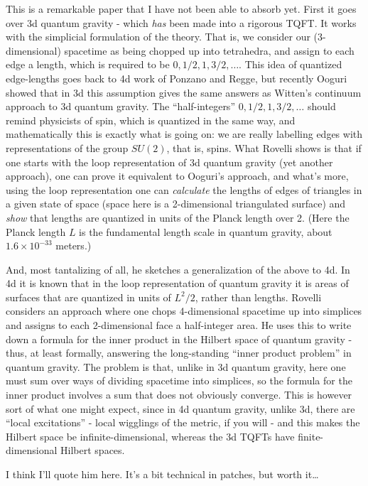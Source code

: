 \documentclass{article}
\begin{document}
This is a remarkable paper that I have not been able to absorb yet.
First it goes over 3d quantum gravity - which \emph{has} been made into
a rigorous TQFT. It works with the simplicial formulation of the theory.
That is, we consider our (3-dimensional) spacetime as being chopped up
into tetrahedra, and assign to each edge a length, which is required to
be \(0,1/2,1,3/2,\ldots\). This idea of quantized edge-lengths goes back
to 4d work of Ponzano and Regge, but recently Ooguri showed that in 3d
this assumption gives the same answers as Witten's continuum approach to
3d quantum gravity. The ``half-integers'' \(0,1/2,1,3/2,\ldots\) should
remind physicists of spin, which is quantized in the same way, and
mathematically this is exactly what is going on: we are really labelling
edges with representations of the group \(SU(2)\), that is, spins. What
Rovelli shows is that if one starts with the loop representation of 3d
quantum gravity (yet another approach), one can prove it equivalent to
Ooguri's approach, and what's more, using the loop representation one
can \emph{calculate} the lengths of edges of triangles in a given state
of space (space here is a 2-dimensional triangulated surface) and
\emph{show} that lengths are quantized in units of the Planck length
over 2. (Here the Planck length \(L\) is the fundamental length scale in
quantum gravity, about \(1.6 \times 10^{-33}\) meters.)

And, most tantalizing of all, he sketches a generalization of the above
to 4d. In 4d it is known that in the loop representation of quantum
gravity it is areas of surfaces that are quantized in units of
\(L^2/2\), rather than lengths. Rovelli considers an approach where one
chops 4-dimensional spacetime up into simplices and assigns to each
2-dimensional face a half-integer area. He uses this to write down a
formula for the inner product in the Hilbert space of quantum gravity -
thus, at least formally, answering the long-standing ``inner product
problem'' in quantum gravity. The problem is that, unlike in 3d quantum
gravity, here one must sum over ways of dividing spacetime into
simplices, so the formula for the inner product involves a sum that does
not obviously converge. This is however sort of what one might expect,
since in 4d quantum gravity, unlike 3d, there are ``local excitations''
- local wigglings of the metric, if you will - and this makes the
Hilbert space be infinite-dimensional, whereas the 3d TQFTs have
finite-dimensional Hilbert spaces.

I think I'll quote him here. It's a bit technical in patches, but worth
it\ldots{}
\end{document}
